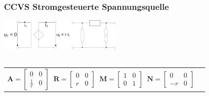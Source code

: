\documentclass[a4paper,twocolumn,10pt]{article}
\begin{document}
\subsubsection*{CCVS Stromgesteuerte Spannungsquelle}
\includegraphics[width=0.45\textwidth]{img/OP_ISU}\\\\
\begin{tabular}{ll}
$\textbf{A}=\begin{bmatrix}0 & 0\\ \frac{1}{r} & 0\end{bmatrix}\;\;\textbf{R}=\begin{bmatrix}0 & 0\\ r & 0\end{bmatrix}\;\;\textbf{M}=\begin{bmatrix}1 & 0\\ 0 & 1\end{bmatrix}\;\;\textbf{N}=\begin{bmatrix}0 & 0\\ -r & 0\end{bmatrix}$
\end{tabular}
\end{document}

